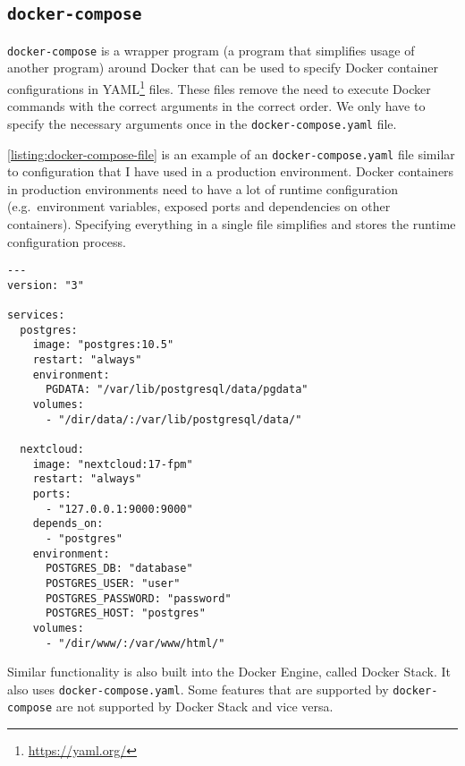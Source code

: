 \subsection{\texorpdfstring{\lstinline{docker-compose}}{docker-compose}}
\lstinline{docker-compose} is a wrapper program (a program that simplifies usage of another program) around Docker that can be used to specify Docker container configurations in YAML\footnote{\url{https://yaml.org/}} files. These files remove the need to execute Docker commands with the correct arguments in the correct order. We only have to specify the necessary arguments once in the \lstinline{docker-compose.yaml} file.

\medskip

\autoref{listing:docker-compose-file} is an example of an \lstinline{docker-compose.yaml} file similar to configuration that I have used in a production environment. Docker containers in production environments need to have a lot of runtime configuration (e.g.\ environment variables, exposed ports and dependencies on other containers). Specifying everything in a single file simplifies and stores the runtime configuration process.
\begin{lstlisting}[caption={Example \lstinline{docker-compose.yaml}.},label={listing:docker-compose-file},captionpos=b]
---
version: "3"

services:
  postgres:
    image: "postgres:10.5"
    restart: "always"
    environment:
      PGDATA: "/var/lib/postgresql/data/pgdata"
    volumes:
      - "/dir/data/:/var/lib/postgresql/data/"

  nextcloud:
    image: "nextcloud:17-fpm"
    restart: "always"
    ports:
      - "127.0.0.1:9000:9000"
    depends_on:
      - "postgres"
    environment:
      POSTGRES_DB: "database"
      POSTGRES_USER: "user"
      POSTGRES_PASSWORD: "password"
      POSTGRES_HOST: "postgres"
    volumes:
      - "/dir/www/:/var/www/html/"
\end{lstlisting}

Similar functionality is also built into the Docker Engine, called Docker Stack. It also uses \lstinline{docker-compose.yaml}. Some features that are supported by \lstinline{docker-compose} are not supported by Docker Stack and vice versa.
